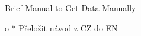 \app Brief Manual to Get Data Manually

		\Green
		\begitems \style o
			* Přeložit návod z CZ do EN
		\enditems
		\Black

